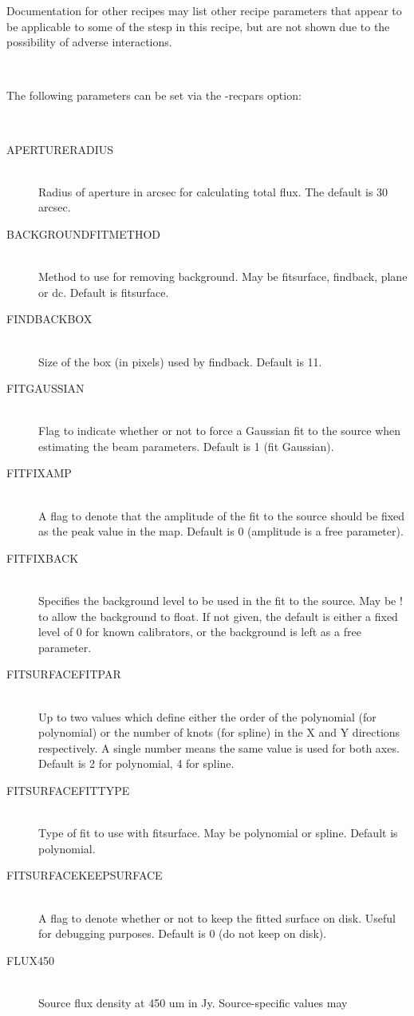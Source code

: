 \documentclass[twoside,11pt]{article}
\renewcommand{\_}{\texttt{\symbol{95}}}
\newcommand{\sstsubsection}[1]{ \item[{#1}] \mbox{} \\}
\newcommand{\sstdiylist}[2]{
   \item[#1:] \mbox{} \\
   \vspace{-3.5ex}
   \begin{description}
      #2
   \end{description}
}
\newcommand{\sstitem}{\item}
\newcommand{\sstsubsection}[1]{\item[{#1}]}
\newcommand{\sstitem}{\item}
\begin{document}
{{{         \sstitem
         Documentation for other recipes may list other recipe
         parameters that appear to be applicable to some of the stesp in
         this recipe, but are not shown due to the possibility of adverse
         interactions.
      }
   }
   \sstdiylist{
      Available Parameters
   }{
      \sstsubsection{
         The following parameters can be set via the -recpars option:
      }{
      }
      \sstsubsection{
         APERTURE\_RADIUS
      }{
         Radius of aperture in arcsec for calculating total flux. The
         default is 30 arcsec.
      }
      \sstsubsection{
         BACKGROUND\_FITMETHOD
      }{
         Method to use for removing background. May be fitsurface,
         findback, plane or dc. Default is fitsurface.
      }
      \sstsubsection{
         FINDBACK\_BOX
      }{
         Size of the box (in pixels) used by findback. Default is 11.
      }
      \sstsubsection{
         FIT\_GAUSSIAN
      }{
         Flag to indicate whether or not to force a Gaussian fit to the
         source when estimating the beam parameters. Default is 1 (fit
         Gaussian).
      }
      \sstsubsection{
         FIT\_FIXAMP
      }{
         A flag to denote that the amplitude of the fit to the source
         should be fixed as the peak value in the map. Default is 0
         (amplitude is a free parameter).
      }
      \sstsubsection{
         FIT\_FIXBACK
      }{
         Specifies the background level to be used in the fit to the
         source. May be ! to allow the background to float. If not
         given, the default is either a fixed level of 0 for known
         calibrators, or the background is left as a free parameter.
      }
      \sstsubsection{
         FITSURFACE\_FITPAR
      }{
         Up to two values which define either the order of the
         polynomial (for polynomial) or the number of knots (for spline)
         in the X and Y directions respectively. A single number means
         the same value is used for both axes. Default is 2 for
         polynomial, 4 for spline.
      }
      \sstsubsection{
         FITSURFACE\_FITTYPE
      }{
         Type of fit to use with fitsurface. May be polynomial or
         spline. Default is polynomial.
      }
      \sstsubsection{
         FITSURFACE\_KEEPSURFACE
      }{
         A flag to denote whether or not to keep the fitted surface on
         disk. Useful for debugging purposes. Default is 0 (do not keep
         on disk).
      }
      \sstsubsection{
         FLUX\_450
      }{
         Source flux density at 450 um in Jy. Source-specific values may
}}}
\end{document}
